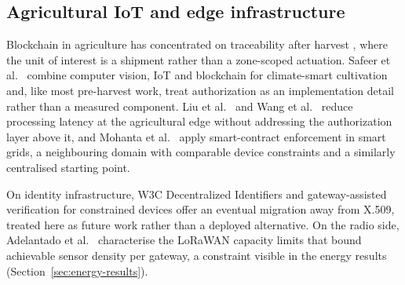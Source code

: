 \subsection{Agricultural IoT and edge infrastructure}

Blockchain in agriculture has concentrated on traceability after harvest \citep{tian2017supply,lin2019food,bandara2021fabric}, where the unit of interest is a shipment rather than a zone-scoped actuation. Safeer et al.\ \citep{safeer2025agrifarming} combine computer vision, IoT and blockchain for climate-smart cultivation and, like most pre-harvest work, treat authorization as an implementation detail rather than a measured component. Liu et al.\ \citep{liu2019distributed} and Wang et al.\ \citep{wang2020convergence} reduce processing latency at the agricultural edge without addressing the authorization layer above it, and Mohanta et al.\ \citep{mohanta2025smartcontract} apply smart-contract enforcement in smart grids, a neighbouring domain with comparable device constraints and a similarly centralised starting point.

On identity infrastructure, W3C Decentralized Identifiers \citep{w3c2022did} and gateway-assisted verification for constrained devices \citep{ferdous2019search,tara2023decentralized} offer an eventual migration away from X.509, treated here as future work rather than a deployed alternative. On the radio side, Adelantado et al.\ \citep{adelantado2017understanding} characterise the LoRaWAN capacity limits that bound achievable sensor density per gateway, a constraint visible in the energy results (Section~\ref{sec:energy-results}).
